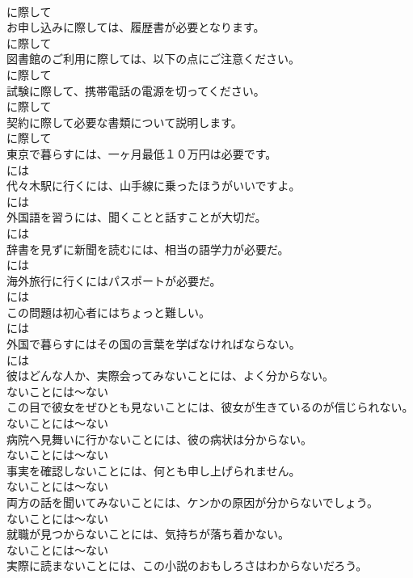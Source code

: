 \documentclass[8pt]{extreport}
\begin{document}
\begin{CJK}{UTF8}{min}
\\	に際して
\\	お申し込みに際しては、履歴書が必要となります。	
\\	に際して
\\	図書館のご利用に際しては、以下の点にご注意ください。	
\\	に際して
\\	試験に際して、携帯電話の電源を切ってください。	
\\	に際して
\\	契約に際して必要な書類について説明します。	
\\	に際して
\\	東京で暮らすには、一ヶ月最低１０万円は必要です。	
\\	には
\\	代々木駅に行くには、山手線に乗ったほうがいいですよ。	
\\	には
\\	外国語を習うには、聞くことと話すことが大切だ。	
\\	には
\\	辞書を見ずに新聞を読むには、相当の語学力が必要だ。	
\\	には
\\	海外旅行に行くにはパスポートが必要だ。	
\\	には
\\	この問題は初心者にはちょっと難しい。	
\\	には
\\	外国で暮らすにはその国の言葉を学ばなければならない。	
\\	には
\\	彼はどんな人か、実際会ってみないことには、よく分からない。	
\\	ないことには～ない
\\	この目で彼女をぜひとも見ないことには、彼女が生きているのが信じられない。	
\\	ないことには～ない
\\	病院へ見舞いに行かないことには、彼の病状は分からない。	
\\	ないことには～ない
\\	事実を確認しないことには、何とも申し上げられません。	
\\	ないことには～ない
\\	両方の話を聞いてみないことには、ケンかの原因が分からないでしょう。	
\\	ないことには～ない
\\	就職が見つからないことには、気持ちが落ち着かない。	
\\	ないことには～ない
\\	実際に読まないことには、この小説のおもしろさはわからないだろう。	

\end{CJK}
\end{document}
